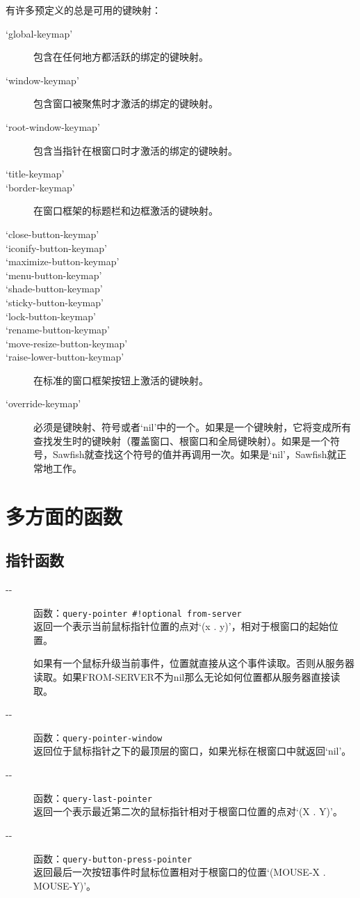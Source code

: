 \documentclass{book}
\begin{document}
\begin{CJK*}{UTF8}{gbsn}
有许多预定义的总是可用的键映射：
\begin{description}
\item[`global-keymap'] 包含在任何地方都活跃的绑定的键映射。
\item[`window-keymap'] 包含窗口被聚焦时才激活的绑定的键映射。
\item[`root-window-keymap'] 包含当指针在根窗口时才激活的绑定的键映射。
\item[`title-keymap'] 
\item[`border-keymap'] 在窗口框架的标题栏和边框激活的键映射。
\item[`close-button-keymap']
\item[`iconify-button-keymap']
\item[`maximize-button-keymap']
\item[`menu-button-keymap']
\item[`shade-button-keymap']
\item[`sticky-button-keymap']
\item[`lock-button-keymap']
\item[`rename-button-keymap']
\item[`move-resize-button-keymap']
\item[`raise-lower-button-keymap'] 在标准的窗口框架按钮上激活的键映射。
\item[`override-keymap'] 必须是键映射、符号或者`nil'中的一个。如果是一个键映射，它将变成所有查找发生时的键映射（覆盖窗口、根窗口和全局键映射）。如果是一个符号，Sawfish就查找这个符号的值并再调用一次。如果是`nil'，Sawfish就正常地工作。
\end{description}
\chapter{多方面的函数}
\section{指针函数}
\begin{description}
\item[-{}-] 函数：\verb|query-pointer #!optional from-server|\\
返回一个表示当前鼠标指针位置的点对`(x . y)'，相对于根窗口的起始位置。

如果有一个鼠标升级当前事件，位置就直接从这个事件读取。否则从服务器读取。如果FROM-SERVER不为nil那么无论如何位置都从服务器直接读取。
\item[-{}-] 函数：\verb|query-pointer-window|\\
返回位于鼠标指针之下的最顶层的窗口，如果光标在根窗口中就返回`nil'。
\item[-{}-] 函数：\verb|query-last-pointer|\\
返回一个表示最近第二次的鼠标指针相对于根窗口位置的点对`(X . Y)'。
\item[-{}-] 函数：\verb|query-button-press-pointer|\\
返回最后一次按钮事件时鼠标位置相对于根窗口的位置`(MOUSE-X . MOUSE-Y)'。


\end{description}
\end{CJK*}
\end{document}
